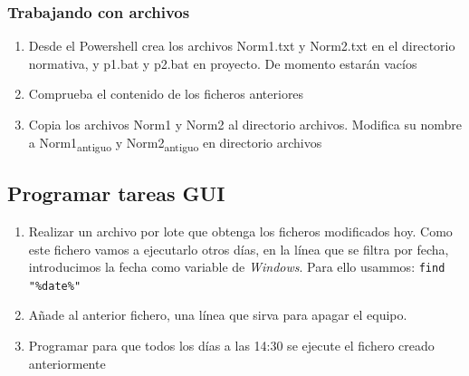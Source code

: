 \documentclass[11pt]{article}
\begin{document}
\subsubsection{Trabajando con archivos}
\label{sec:orgde5d9d8}
\begin{enumerate}
\item Desde el Powershell crea los archivos Norm1.txt y Norm2.txt en el directorio normativa, y p1.bat y p2.bat
en proyecto. De momento estarán vacíos
\item Comprueba el contenido de los ficheros anteriores
\item Copia los archivos Norm1 y Norm2 al directorio archivos. Modifica su nombre a Norm1\textsubscript{antiguo} y Norm2\textsubscript{antiguo} en directorio
archivos
\end{enumerate}
\subsection{Programar tareas GUI}
\label{sec:org430ab01}
\begin{enumerate}
\item Realizar un archivo por lote que obtenga los ficheros modificados hoy. Como este fichero vamos a ejecutarlo otros días, en la línea
que se filtra por fecha, introducimos la fecha como variable de \emph{Windows}. Para ello usammos: \texttt{find "\%date\%"}
\item Añade al anterior fichero, una línea que sirva para apagar el equipo.
\item Programar para que todos los días a las 14:30 se ejecute el fichero creado anteriormente
\end{enumerate}
\end{document}
